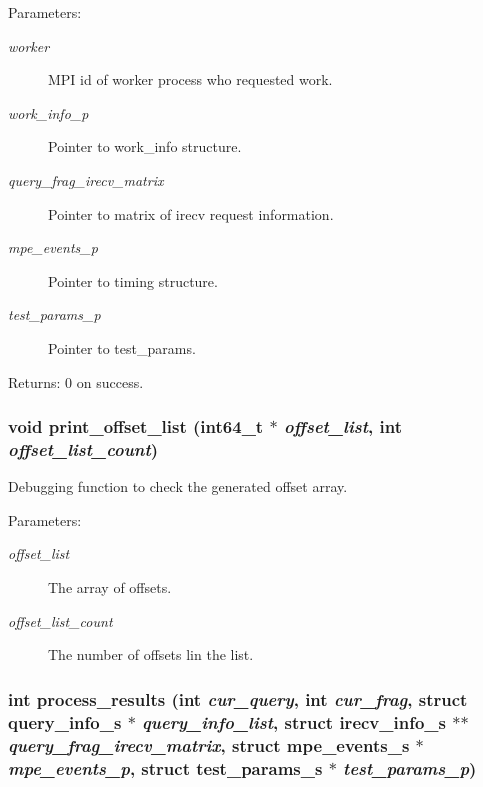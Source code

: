 \begin{Desc}
\item[Parameters:]
\begin{description}
\item[{\em worker}]MPI id of worker process who requested work. \item[{\em work\_\-info\_\-p}]Pointer to work\_\-info structure. \item[{\em query\_\-frag\_\-irecv\_\-matrix}]Pointer to matrix of irecv request information. \item[{\em mpe\_\-events\_\-p}]Pointer to timing structure. \item[{\em test\_\-params\_\-p}]Pointer to test\_\-params. \end{description}
\end{Desc}
\begin{Desc}
\item[Returns:]0 on success. \end{Desc}
\subsubsection{\setlength{\rightskip}{0pt plus 5cm}void print\_\-offset\_\-list (int64\_\-t $\ast$ {\em offset\_\-list}, int {\em offset\_\-list\_\-count})}\label{master__help_8h_37807c4b5a6db9d3a82df0915b9500d5}


Debugging function to check the generated offset array.

\begin{Desc}
\item[Parameters:]
\begin{description}
\item[{\em offset\_\-list}]The array of offsets. \item[{\em offset\_\-list\_\-count}]The number of offsets lin the list. \end{description}
\end{Desc}
\subsubsection{\setlength{\rightskip}{0pt plus 5cm}int process\_\-results (int {\em cur\_\-query}, int {\em cur\_\-frag}, struct \bf{query\_\-info\_\-s} $\ast$ {\em query\_\-info\_\-list}, struct \bf{irecv\_\-info\_\-s} $\ast$$\ast$ {\em query\_\-frag\_\-irecv\_\-matrix}, struct \bf{mpe\_\-events\_\-s} $\ast$ {\em mpe\_\-events\_\-p}, struct \bf{test\_\-params\_\-s} $\ast$ {\em test\_\-params\_\-p})}\label{master__help_8h_fb19fb09cef43dcdcb08fc990076133b}


